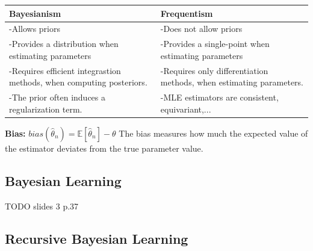 \begin{center}
\begin{tabular}{ L{6cm}| L{6cm} }
 Bayesianism  & Frequentism \\ 
 \hline
 -Allows priors  & -Does not allow priors \\  
 -Provides a distribution when estimating parameters  & -Provides a single-point when estimating parameters\\
 -Requires efficient integrastion methods, when computing posteriors. &
 -Requires only differentiation methods, when estimating parameters.\\
 -The prior often induces a regularization term. & -MLE estimators are consistent, equivariant,...\\
\end{tabular}
\end{center}

\textbf{Bias: } $bias(\hat{\theta}_n) = \mathbb{E}[\hat{\theta}_n] - \theta$ The bias measures how much the expected value of the estimator deviates from the true parameter value.

\subsection{Bayesian Learning}
TODO slides 3 p.37

\subsection{Recursive Bayesian Learning}



